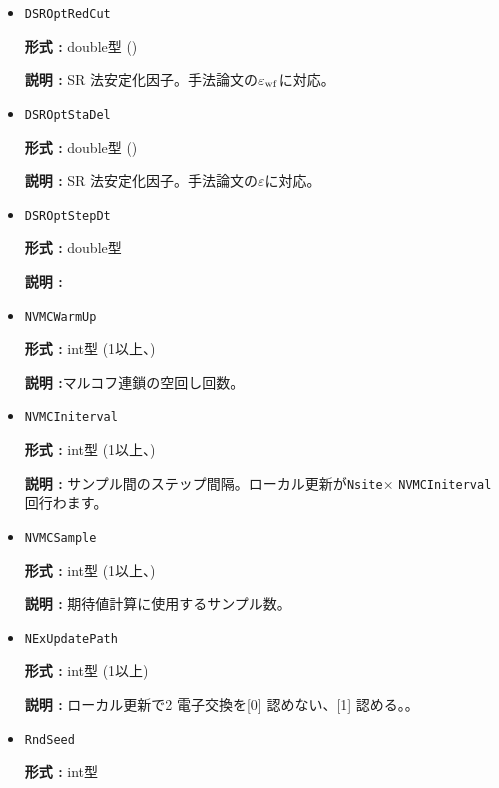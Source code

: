 \begin{itemize}
{\bf 形式 :} int型 (1以上数、\verb|NSROptItrStep|/10)

{\bf 説明 :} \verb|NSROptItrStep|ステップ中、最後の\verb|NSROptItrSmp|ステップでの各変分パラメータの平均値を最適値とする。\verb|NVMCCalMode|=0の場合のみ使用されます。

\item   \verb|DSROptRedCut|
   
{\bf 形式 :} double型 ()

{\bf 説明 :} SR 法安定化因子。手法論文の$\varepsilon_{\rm wf}$に対応。

 \item  \verb|DSROptStaDel| 
   
 {\bf 形式 :} double型 ()

  {\bf 説明 :} SR 法安定化因子。手法論文の$\varepsilon$に対応。
     
\item \verb|DSROptStepDt|

{\bf 形式 :} double型 

{\bf 説明 :} 
 
\item \verb|NVMCWarmUp|

{\bf 形式 :} int型 (1以上、)

{\bf 説明 :}マルコフ連鎖の空回し回数。

\item \verb|NVMCIniterval|

{\bf 形式 :} int型 (1以上、)

{\bf 説明 :} サンプル間のステップ間隔。ローカル更新が\verb|Nsite|× \verb|NVMCIniterval| 回行わます。

\item \verb|NVMCSample|

{\bf 形式 :} int型 (1以上、)

{\bf 説明 :} 期待値計算に使用するサンプル数。

\item \verb|NExUpdatePath|

{\bf 形式 :} int型 (1以上)

{\bf 説明 :} ローカル更新で2 電子交換を[0] 認めない、[1] 認める。。

\item \verb|RndSeed|

{\bf 形式 :} int型 


\end{itemize}
